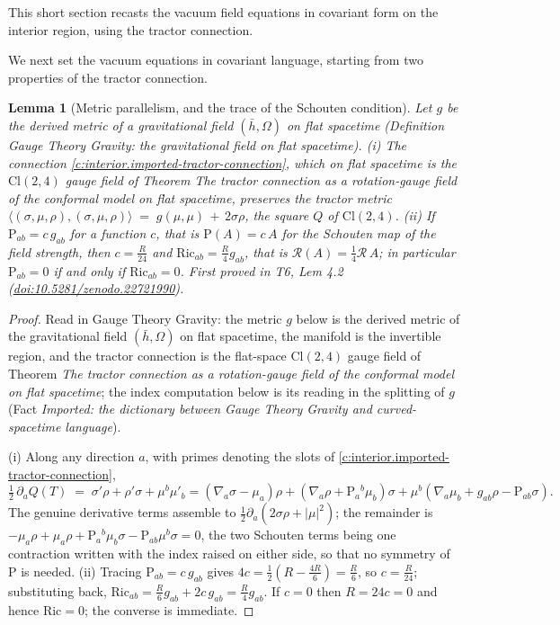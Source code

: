 \documentclass[11pt]{article}
\newtheorem{lemma}[theorem]{Lemma}
\theoremstyle{definition}
\theoremstyle{plain}
\providecommand{\Cl}{}\renewcommand{\Cl}{\mathrm{Cl}}
\providecommand{\Ric}{}\renewcommand{\Ric}{\mathrm{Ric}}
\providecommand{\Sch}{}\renewcommand{\Sch}{\mathrm{P}}
\providecommand{\hb}{}\renewcommand{\hb}{\bar{h}}
\providecommand{\ip}{}\renewcommand{\ip}[2]{\langle #1, #2\rangle}
\begin{document}
This short section recasts the vacuum field equations in covariant form on the interior region, using the tractor connection.

We next set the vacuum equations in covariant language, starting from two properties of the tractor connection.

\begin{lemma}[Metric parallelism, and the trace of the Schouten condition]\label{c:interior.metric-parallelism-trace-schouten-condition}
Let $g$ be the derived metric of a gravitational field $(\hb, \Omega)$ on flat spacetime (Definition \emph{Gauge Theory Gravity: the gravitational field on flat spacetime}). (i) The connection \ref{c:interior.imported-tractor-connection}, which on flat spacetime is the $\Cl(2,4)$ gauge field of Theorem \emph{The tractor connection as a rotation-gauge field of the conformal model on flat spacetime}, preserves the tractor metric $\ip{(\sigma,\mu,\rho)}{(\sigma,\mu,\rho)} \;=\; g(\mu,\mu) \,+\, 2\sigma\rho$, the square $Q$ of $\Cl(2,4)$. (ii) If $\Sch_{ab} = c\, g_{ab}$ for a function $c$, that is $\Sch(A) = c\,A$ for the Schouten map of the field strength, then $c = \tfrac{R}{24}$ and $\Ric_{ab} = \tfrac{R}{4} g_{ab}$, that is $\mathcal{R}(A) = \tfrac14\mathcal{R}\,A$; in particular $\Sch_{ab} = 0$ if and only if $\Ric_{ab} = 0$.
\emph{First proved in} T6, Lem 4.2 (\href{https://doi.org/10.5281/zenodo.22721990}{doi:10.5281/zenodo.22721990}).
\end{lemma}
\begin{proof}
Read in Gauge Theory Gravity: the metric $g$ below is the derived metric of the gravitational field $(\hb, \Omega)$ on flat spacetime, the manifold is the invertible region, and the tractor connection is the flat-space $\Cl(2,4)$ gauge field of Theorem \emph{The tractor connection as a rotation-gauge field of the conformal model on flat spacetime}; the index computation below is its reading in the splitting of $g$ (Fact \emph{Imported: the dictionary between Gauge Theory Gravity and curved-spacetime language}).

(i) Along any direction $a$, with primes denoting the slots of \ref{c:interior.imported-tractor-connection},
\[
\tfrac12\,\partial_a Q(T) \;=\; \sigma'\rho + \rho'\sigma + \mu^b\mu'_b
= (\nabla_a\sigma - \mu_a)\rho + (\nabla_a\rho + \Sch_a{}^b\mu_b)\sigma + \mu^b(\nabla_a\mu_b + g_{ab}\rho - \Sch_{ab}\sigma).
\]
The genuine derivative terms assemble to $\tfrac12\partial_a(2\sigma\rho + |\mu|^2)$; the remainder is $-\mu_a\rho + \mu_a \rho + \Sch_a{}^b\mu_b\sigma - \Sch_{ab}\mu^b\sigma = 0$, the two Schouten terms being one contraction written with the index raised on either side, so that no symmetry of $\Sch$ is needed.
(ii) Tracing $\Sch_{ab} = c\,g_{ab}$ gives $4c = \tfrac12(R - \tfrac{4R}{6}) = \tfrac{R}{6}$, so $c = \tfrac{R}{24}$; substituting back, $\Ric_{ab} = \tfrac{R}{6}g_{ab} + 2c\,g_{ab} = \tfrac{R}{4}g_{ab}$. If $c = 0$ then $R = 24c = 0$ and hence $\Ric = 0$; the converse is immediate.

\end{proof}
\end{document}
